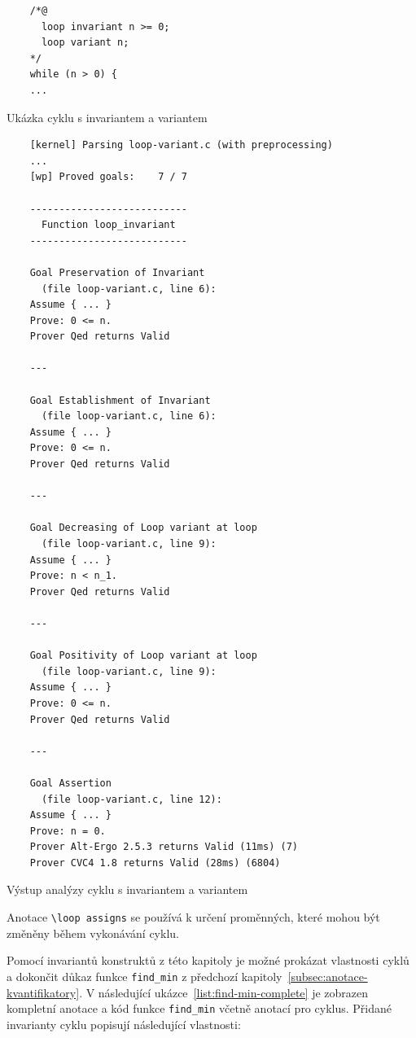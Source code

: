 \begin{listing}[H]
    \begin{verbatim}
    /*@
      loop invariant n >= 0;
      loop variant n;
    */
    while (n > 0) {
    ...
    \end{verbatim}
    \caption{Ukázka cyklu s invariantem a variantem}
    \label{list:loop-with-variant}
\end{listing}

\begin{listing}[H]
    \begin{verbatim}
    [kernel] Parsing loop-variant.c (with preprocessing)
    ...
    [wp] Proved goals:    7 / 7

    ---------------------------
      Function loop_invariant
    ---------------------------

    Goal Preservation of Invariant
      (file loop-variant.c, line 6):
    Assume { ... }
    Prove: 0 <= n.
    Prover Qed returns Valid

    ---

    Goal Establishment of Invariant
      (file loop-variant.c, line 6):
    Assume { ... }
    Prove: 0 <= n.
    Prover Qed returns Valid

    ---

    Goal Decreasing of Loop variant at loop
      (file loop-variant.c, line 9):
    Assume { ... }
    Prove: n < n_1.
    Prover Qed returns Valid

    ---

    Goal Positivity of Loop variant at loop
      (file loop-variant.c, line 9):
    Assume { ... }
    Prove: 0 <= n.
    Prover Qed returns Valid

    ---

    Goal Assertion
      (file loop-variant.c, line 12):
    Assume { ... }
    Prove: n = 0.
    Prover Alt-Ergo 2.5.3 returns Valid (11ms) (7)
    Prover CVC4 1.8 returns Valid (28ms) (6804)
    \end{verbatim}
    \caption{Výstup analýzy cyklu s invariantem a variantem}
    \label{list:loop-with-variant-output}
\end{listing}

Anotace \texttt{\textbackslash loop assigns} se používá k určení proměnných,
které mohou být změněny během vykonávání cyklu.

Pomocí invariantů konstruktů z této kapitoly
je možné prokázat vlastnosti cyklů a dokončit důkaz funkce \texttt{find\_min}
z předchozí kapitoly~\ref{subsec:anotace-kvantifikatory}.
V následující ukázce~\ref{list:find-min-complete} je zobrazen
kompletní anotace a kód funkce \texttt{find\_min} včetně anotací pro cyklus.
Přidané invarianty cyklu popisují následující vlastnosti:

